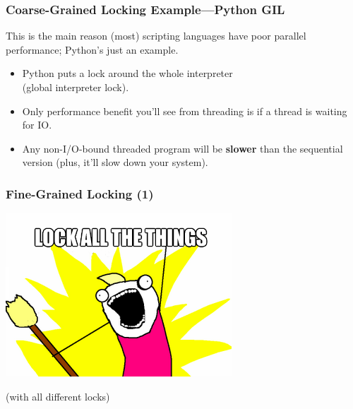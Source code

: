 \documentclass[aspectratio=43]{beamer}
\newenvironment{changemargin}[1]{%
  \begin{list}{}{%
    \setlength{\topsep}{0pt}%
    \setlength{\leftmargin}{#1}%
    \setlength{\rightmargin}{1em}
    \setlength{\listparindent}{\parindent}%
    \setlength{\itemindent}{\parindent}%
    \setlength{\parsep}{\parskip}%
  }%
  \item[]}{\end{list}}
\begin{document}
\begin{frame}
  \frametitle{Coarse-Grained Locking Example---Python GIL}

  \begin{changemargin}{1cm}
  This is the main reason (most) scripting languages have poor parallel
  performance; Python's just an example.

  \begin{itemize}
    \item Python puts a lock around the whole interpreter\\ \quad (global interpreter lock).

    \item Only performance benefit you'll see from threading is if a thread is
      waiting for IO.

    \item Any non-I/O-bound threaded program will be {\bf slower} than the sequential
      version (plus, it'll slow down your system).
  \end{itemize}
  \end{changemargin}
\end{frame}

\begin{frame}
  \frametitle{Fine-Grained Locking (1)}

  \begin{center}
    \includegraphics[scale=0.5]{L21/lock-all-the-things}

    (with all different locks)
  \end{center}
\end{frame}
\end{document}
